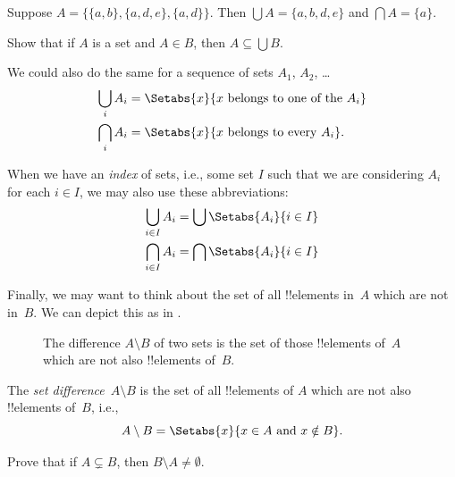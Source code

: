 \documentclass[../../../include/open-logic-section]{subfiles}
\begin{document}
\begin{ex}
Suppose $A = \{ \{ a, b \}, \{ a, d, e \}, \{ a, d \} \}$.
Then $\bigcup A = \{ a, b, d, e \}$ and $\bigcap A = \{ a \}$.
\end{ex}
\begin{prob}
	Show that if $A$ is a set and $A \in B$, then $A \subseteq \bigcup B$.
\end{prob}

We could also do the same for a sequence of sets $A_1$, $A_2$, \dots
\begin{align*}
\bigcup_i A_i & = \Setabs{x}{x \text{ belongs to one of the } A_i}\\
\bigcap_i A_i & = \Setabs{x}{x \text{ belongs to every } A_i}.
\end{align*}

When we have an \emph{index} of sets, i.e., some set $I$ such that we
are considering $A_i$ for each $i \in I$, we may also use these
abbreviations:
\begin{align*}
	\bigcup_{i \in I} A_i & = \bigcup \Setabs{A_i }{i \in I}\\
	\bigcap_{i \in I} A_i & = \bigcap\Setabs{A_i}{i \in I}
\end{align*}

Finally, we may want to think about the set of all !!{element}s in~$A$
which are not in~$B$. We can depict this as in .

\begin{figure}
  \caption{The difference $A \setminus B$ of two sets is the set of
    those !!{element}s of~$A$ which are not also !!{element}s of~$B$.}
\end{figure}

\begin{defn}[Difference]
The \emph{set difference}~$A \setminus B$ is the set of all !!{element}s of
$A$ which are not also !!{element}s of~$B$, i.e.,
\[
A\setminus B = \Setabs{x}{x\in A \text{ and } x \notin B}.
\]
\end{defn}

\begin{prob}
	Prove that if $A \subsetneq B$, then $B \setminus A \neq \emptyset$.
\end{prob}
\end{document}
